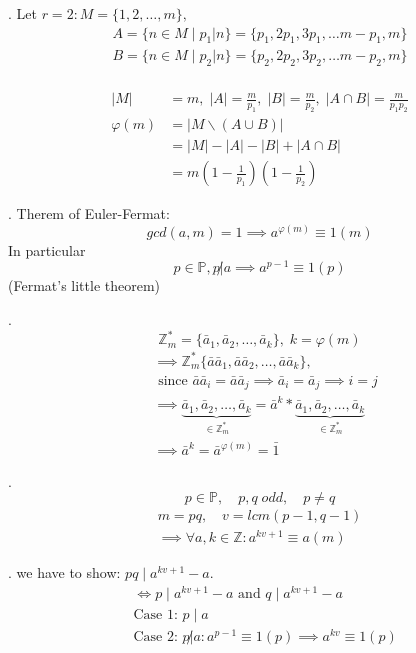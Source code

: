 \Proof.
Let $r=2: M = \{1,2, \ldots, m\},$ 
\begin{align*}
  A = \{ n \in M \mid p_1|n\} = \{p_1, 2p_1, 3p_1, \ldots m-p_1, m\} \\
  B = \{ n \in M \mid p_2|n\} = \{p_2, 2p_2, 3p_2, \ldots m-p_2, m\} \\
\end{align*}

\begin{align*}
  |M| &= m, \; |A| = \frac{m}{p_1}, \; |B| = \frac{m}{p_2}, \;
    |A \cap B| = \frac{m}{p_1p_2}\\
  \varphi(m) 
    &= | M \backslash(A\cup B) | \\
    &= |M| - |A| - |B| + | A \cap B|\\
    &= m \left(1- \frac{1}{p_1} \right) \left(1- \frac{1}{p_2} \right)
\end{align*}

\Theorem.
Therem of Euler-Fermat:
\[
  gcd(a,m) = 1 \implies a ^{\varphi(m)} \equiv 1 (m)
\]
In particular 
\[
  p \in \mathbb{P}, p \not| a \implies a^{p-1} \equiv 1 (p)
\]
(Fermat's little theorem)

\Proof.
\[
  \mathbb{Z}_m^{*} = \{\bar{a}_1, \bar{a}_2, \ldots, \bar{a}_k \}, \;k = \varphi(m)
\]
\begin{align*}
  &\implies \mathbb{Z}_m^{*} \{\bar{a}\bar{a}_1, \bar{a}\bar{a}_2, \ldots, \bar{a}\bar{a}_k \}, \\
  &\text{ since } \bar{a}\bar{a}_i = \bar{a}\bar{a}_j
    \implies \bar{a}_i = \bar{a}_j \implies i = j \\
  &\implies \underbrace{\bar{a}_1, \bar{a}_2, \ldots, \bar{a}_k}_
        {\in \mathbb{Z}_m^{*}}
      = \bar{a}^k * \underbrace{\bar{a}_1, \bar{a}_2, \ldots, \bar{a}_k}_
        {\in \mathbb{Z}_m^{*}} \\
  &\implies \bar{a}^k = \bar{a}^{\varphi(m)} = \bar{1} 
\end{align*}

\Theorem.
\[
  p \in \mathbb{P}, \quad p,q\; odd, \quad p \neq q
\]
\begin{align*}
  m = pq, \quad v = lcm(p-1, q-1) \\
  \implies \forall a,k \in \mathbb{Z}: a^{kv + 1} \equiv a(m)
\end{align*}

\Proof.
we have to show: $pq \mid a ^{kv +1} - a$. 
\begin{align*}
  &\Leftrightarrow p \mid a ^{kv +1} - a \text{ and } q \mid a ^{kv +1} - a\\
  &\text{Case 1: } p \mid a \\
  &\text{Case 2: } p\not| a: 
    a^{p-1} \equiv 1 (p) \implies a^{kv} \equiv 1(p)
\end{align*}

